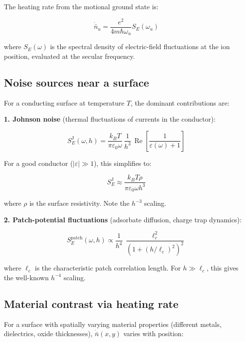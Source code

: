 \documentclass[11pt,a4paper]{article}
\begin{document}
The heating rate from the motional ground state is:

\begin{equation}
\dot{\bar{n}}_u = \frac{e^2}{4m\hbar\omega_u}S_E(\omega_u)
\label{eq:heating_rate}
\end{equation}

where $S_E(\omega)$ is the spectral density of electric-field fluctuations
at the ion position, evaluated at the secular frequency.

\subsection{Noise sources near a surface}

For a conducting surface at temperature $T$, the dominant contributions are:

\textbf{1. Johnson noise} (thermal fluctuations of currents in the conductor):

\begin{equation}
S_E^{\text{J}}(\omega, h) = \frac{k_B T}{\pi\varepsilon_0\omega}\,
    \frac{1}{h^3}\,\operatorname{Re}\left[\frac{1}{\varepsilon(\omega)+1}\right]
\label{eq:johnson_noise}
\end{equation}

For a good conductor ($|\varepsilon| \gg 1$), this simplifies to:

\begin{equation}
S_E^{\text{J}} \approx \frac{k_B T\rho}{\pi\varepsilon_0\omega h^3}
\label{eq:johnson_simple}
\end{equation}

where $\rho$ is the surface resistivity. Note the $h^{-3}$ scaling.

\textbf{2. Patch-potential fluctuations} (adsorbate diffusion, charge trap dynamics):

\begin{equation}
S_E^{\text{patch}}(\omega, h) \propto \frac{1}{h^4}\,
    \frac{\ell_c^2}{(1 + (h/\ell_c)^2)^2}
\label{eq:patch_noise}
\end{equation}

where $\ell_c$ is the characteristic patch correlation length. For $h \gg \ell_c$,
this gives the well-known $h^{-4}$ scaling.

\subsection{Material contrast via heating rate}

For a surface with spatially varying material properties (different metals,
dielectrics, oxide thicknesses), $\dot{\bar{n}}(x,y)$ varies with position:
\end{document}
